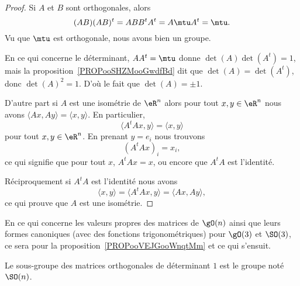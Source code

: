 \begin{proof}
    Si \( A\) et \( B\) sont orthogonales, alors
    \begin{equation}
        (AB)(AB)^t=ABB^tA^t=A\mtu A^t=\mtu.
    \end{equation}
    Vu que \( \mtu\) est orthogonale, nous avons bien un groupe.

    En ce qui concerne le déterminant, \( AA^t=\mtu\) donne \( \det(A)\det(A^t)=1\), mais la proposition~\ref{PROPooSHZMooGwdfBd} dit que \( \det(A)=\det(A^t)\), donc \( \det(A)^2=1\). D'où le fait que \( \det(A)=\pm 1\).

    D'autre part si \( A\) est une isométrie de \( \eR^n\) alors pour tout \( x,y\in \eR^n\) nous avons \( \langle Ax, Ay\rangle =\langle x, y\rangle \). En particulier,
    \begin{equation}
        \langle A^tAx, y\rangle =\langle x, y\rangle
    \end{equation}
    pour tout \( x,y\in \eR^n\). En prenant \( y=e_i\) nous trouvons
    \begin{equation}
        (A^tAx)_i=x_i,
    \end{equation}
    ce qui signifie que pour tout \( x\), \( A^tAx=x\), ou encore que \( A^tA\) est l'identité.

    Réciproquement si \( A^tA\) est l'identité nous avons
    \begin{equation}
        \langle x, y\rangle =\langle A^tAx, y\rangle =\langle Ax, Ay\rangle ,
    \end{equation}
    ce qui prouve que \( A\) est une isométrie.
\end{proof}

En ce qui concerne les valeurs propres des matrices de \( \gO(n)\) ainsi que leurs formes canoniques (avec des fonctions trigonométriques) pour \( \gO(3)\) et \( \SO(3)\), ce sera pour la proposition~\ref{PROPooVEJGooWnqtMm} et ce qui s'ensuit.

\begin{definition}      \label{DEFooJLNQooBKTYUy}
    Le sous-groupe des matrices orthogonales de déterminant \( 1\) est le groupe  noté \( \SO(n)\).
\end{definition}

